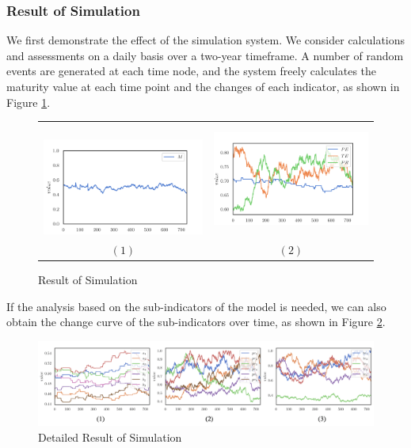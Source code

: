 \documentclass{mcmthesis}
\begin{document}
\subsubsection{Result of Simulation}
We first demonstrate the effect of the simulation system. We consider calculations and assessments on a daily basis over a two-year timeframe. A number of random events are generated at each time node, and the system freely calculates the maturity value at each time point and the changes of each indicator, as shown in Figure \ref{figure::Result of Simulation}.
\begin{figure}[!htbp]
    \small
    \centering
    \begin{tabular}{cc}
        \ \includegraphics[width=6cm]{figures/simulationresult/M.png} &
        \includegraphics[width=6cm]{figures/simulationresult/inx3_time.png} \\
        $(1)$ & $(2)$ \\
    \end{tabular}
    \caption{Result of Simulation}
    \label{figure::Result of Simulation}
\end{figure}

If the analysis based on the sub-indicators of the model is needed, we can also obtain the change curve of the sub-indicators over time, as shown in Figure \ref{figure::Detailed Result of Simulation}.
\begin{figure}[!htbp]
    \small
    \centering
    \includegraphics[width=15cm]{figures/simulationresult/petepr.png} 
    \caption{Detailed Result of Simulation}
    \label{figure::Detailed Result of Simulation}
\end{figure}
\end{document}
